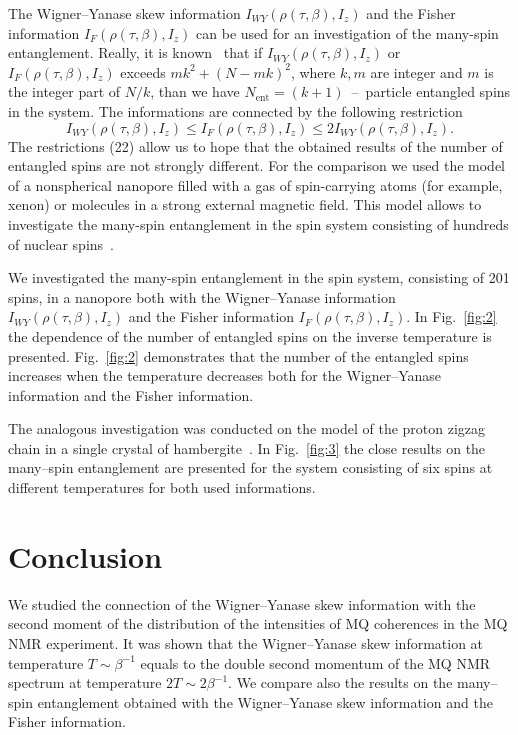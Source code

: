 \documentclass[preprint,12pt]{elsarticle}
\begin{document}
The Wigner--Yanase skew information $I_{WY}(\rho(\tau,\beta),I_z)$ and the Fisher information $I_F(\rho(\tau,\beta),I_z)$ can be used for an investigation of the many-spin entanglement.
Really, it is known~\cite{5,6} that if
$I_{WY}\left( \rho(\tau, \beta), I_z \right)$
or
$I_{F}\left( \rho(\tau, \beta), I_z \right)$
exceeds $mk^2 + (N - mk)^2$,
where $k, m$ are integer and $m$ is the integer part of $N/k$,
than we have $N_\mathrm{ent} = (k + 1) $~--~particle entangled spins in the system.
The informations are connected by the following restriction~\cite{3}
%
\begin{equation} \label{eq:22}
    I_{WY}\left(\rho(\tau,\beta), I_z\right)
    \leq I_F\left(\rho(\tau,\beta), I_z\right)
    \leq 2I_{WY}\left(\rho(\tau,\beta), I_z\right).
\end{equation}
%
The restrictions (22) allow us to hope that the obtained results of the number of entangled spins are not strongly different.
For the comparison we used the model~\cite{23} of a nonspherical nanopore filled with a gas of spin-carrying atoms (for example, xenon) or molecules in a strong external magnetic field.
This model allows to investigate the many-spin entanglement in the spin system consisting of hundreds of nuclear spins~\cite{8}.


We investigated the many-spin entanglement in the spin system, consisting of 201 spins, in a nanopore both with
the Wigner--Yanase information $I_{WY}\left(\rho(\tau, \beta), I_z\right)$
and the Fisher information $I_F\left(\rho(\tau,\beta),I_z\right)$.
In Fig.~\ref{fig:2} the dependence of the number of entangled spins on the inverse temperature is presented.
Fig.~\ref{fig:2} demonstrates that the number of the entangled spins increases when the temperature decreases both for the Wigner--Yanase information and the Fisher information.


The analogous investigation was conducted on the model of the proton zigzag chain in a single crystal of hambergite~\cite{16,24}.
In Fig.~\ref{fig:3} the close results on the many--spin entanglement are presented for the system consisting of six spins at different temperatures for both used informations.


\section{Conclusion}
\label{sec:5}

We studied the connection of the Wigner--Yanase skew information with the second moment of the distribution of the intensities of MQ coherences in the MQ NMR experiment.
It was shown that the Wigner--Yanase skew information at temperature $T \sim \beta^{-1}$ equals to the double second momentum of the MQ NMR spectrum at temperature $2T \sim 2\beta^{-1}$.
We compare also the results on the many--spin entanglement obtained with the Wigner--Yanase skew information and the Fisher information.
\end{document}

